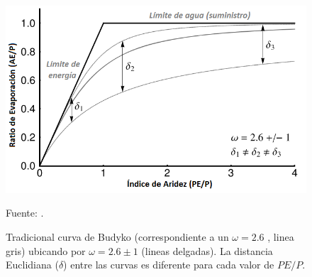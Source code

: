 \vspace{.25cm}
\begin{figure}[ht!]
\centering
	\includegraphics[scale=0.7]{Images/Greve2015_original_budyko.png}
	\caption{Tradicional curva de Budyko (correspondiente a un $\omega = 2.6$ \citep{Fu1981,Zhang2004}, linea gris) ubicando por $\omega = 2.6 \pm 1$ (lineas delgadas). La distancia Euclidiana ($\delta$) entre las curvas es diferente para cada valor de $PE/P$.}
	Fuente: \citet{Greve2015}.
	\label{fig:Greve01}
\end{figure}
